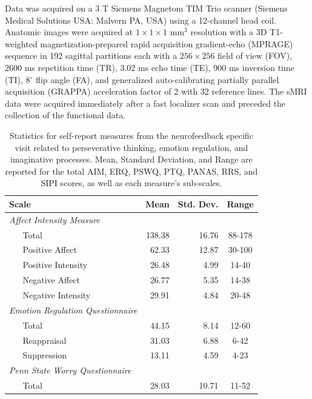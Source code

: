 Data was acquired on a 3 T Siemens Magnetom TIM Trio scanner (Siemens Medical Solutions USA: Malvern PA, USA) using a 12-channel head coil. Anatomic images were acquired at $1 \times 1 \times 1$ mm$^3$ resolution with a 3D T1-weighted magnetization-prepared rapid acquisition gradient-echo (MPRAGE) sequence \cite{Mugler1990} in 192 sagittal partitions each with a $256 \times 256$ field of view (FOV), 2600 ms repetition time (TR), 3.02 ms echo time (TE), 900 ms inversion time (TI), 8$^\circ$ flip angle (FA), and generalized auto-calibrating partially parallel acquisition (GRAPPA) \cite{Griswold2002} acceleration factor of 2 with 32 reference lines. The sMRI data were acquired immediately after a fast localizer scan and preceded the collection of the functional data.



\begin{table}[h!]
    \caption{Statistics for self-report measures from the neurofeedback specific visit related to perseverative thinking, emotion regulation, and imaginative processes. Mean, Standard Deviation, and Range are reported for the total AIM, ERQ, PSWQ, PTQ, PANAS, RRS, and SIPI scores, as well as each measure's sub-scales.}
    \centering
    \begin{tabular}{ llrrc }
        \multicolumn{2}{l}{\textbf{Scale}} & \textbf{Mean} & \textbf{Std. Dev.} & \textbf{Range} \\ \hline
        \multicolumn{2}{l}{\emph{Affect Intensity Measure}} & & & \\
        & Total & 138.38 & 16.76	& 88-178 \\
        & Positive Affect & 62.33 & 12.87	 & 30-100 \\
        & Positive Intensity & 26.48 & 4.99 & 14-40 \\
        & Negative Affect	& 26.77 & 5.35 & 14-38 \\
        & Negative Intensity & 29.91 & 4.84 & 20-48 \\
        \multicolumn{2}{l}{\emph{Emotion Regulation Questionnaire}} & & & \\
        & Total & 44.15 & 8.14 & 12-60 \\
        & Reappraisal & 31.03 & 6.88 & 6-42 \\
        & Suppression & 13.11 & 4.59 & 4-23 \\
        \multicolumn{2}{l}{\emph{Penn State Worry Questionnaire}} & & & \\
        & Total & 28.03 & 10.71 & 11-52 \\

\end{tabular}
\end{table}
